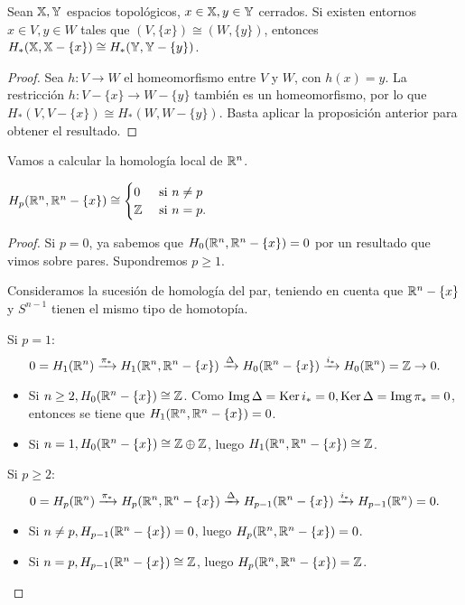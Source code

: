 \begin{proposition}
  Sean ${\mathbb X}, {\mathbb Y}$ espacios topológicos, $x \in {\mathbb X}, y \in {\mathbb Y}$ cerrados. Si existen entornos $x \in V, y \in W$ tales que $(V, \{x\}) \cong (W, \{y\})$,
  entonces $H_*({\mathbb X}, {\mathbb X} - \{x\}) \cong H_*({\mathbb Y}, {\mathbb Y} - \{y\})$.
\end{proposition}

\begin{proof}
  Sea $h \colon V \to W$ el homeomorfismo entre $V$ y $W$, con $h(x) = y$. La restricción $h \colon V - \{x\} \to W - \{y\}$ también es un homeomorfismo,
  por lo que $H_*(V, V - \{x\}) \cong H_*(W, W - \{y\})$. Basta aplicar la proposición anterior para obtener el resultado.
\end{proof}

Vamos a calcular la homología local de $\mathbb{R}^n$.

\begin{proposition}
  $H_p(\mathbb{R}^n, \mathbb{R}^n - \{x\}) \cong \begin{cases} 0 &\text{ si } n \neq p \\ \mathbb{Z} &\text{ si } n = p. \end{cases}$
\end{proposition}

\begin{proof}
  Si $p = 0$, ya sabemos que $H_0(\mathbb{R}^n, \mathbb{R}^n - \{x\}) = 0$ por un resultado que vimos sobre pares. Supondremos $p \geq 1$.

  Consideramos la sucesión de homología del par, teniendo en cuenta que $\mathbb{R}^n - \{x\}$ y $S^{n-1}$ tienen el mismo tipo de homotopía.

  Si $p = 1$:
  \[ 0 = H_1(\mathbb{R}^n) \xrightarrow{\pi_*} H_1(\mathbb{R}^n, \mathbb{R}^n - \{x\}) \xrightarrow{\Delta} H_0(\mathbb{R}^n - \{x\}) \xrightarrow{i_*} H_0(\mathbb{R}^n) = \mathbb{Z} \to 0. \]
  \begin{itemize}
    \item Si $n \geq 2, H_0(\mathbb{R}^n - \{x\}) \cong \mathbb{Z}$. Como $\operatorname{Img} \Delta = \operatorname{Ker} i_* = 0, \operatorname{Ker} \Delta = \operatorname{Img} \pi_* = 0$, entonces se tiene que
          $H_1(\mathbb{R}^n, \mathbb{R}^n - \{x\}) = 0$.
    \item Si $n = 1, H_0(\mathbb{R}^n - \{x\}) \cong \mathbb{Z} \oplus \mathbb{Z}$, luego $H_1(\mathbb{R}^n, \mathbb{R}^n - \{x\}) \cong \mathbb{Z}$.
  \end{itemize}

  Si $p \geq 2$:
  \[ 0 = H_p(\mathbb{R}^n) \xrightarrow{\pi_*} H_p(\mathbb{R}^n, \mathbb{R}^n - \{x\}) \xrightarrow{\Delta} H_{p-1}(\mathbb{R}^n - \{x\}) \xrightarrow{i_*} H_{p-1}(\mathbb{R}^n) = 0. \]
  \begin{itemize}
    \item Si $n \neq p, H_{p-1}(\mathbb{R}^n - \{x\}) = 0$, luego $H_p(\mathbb{R}^n, \mathbb{R}^n - \{x\}) = 0$.
    \item Si $n = p, H_{p-1}(\mathbb{R}^n - \{x\}) \cong \mathbb{Z}$, luego  $H_p(\mathbb{R}^n, \mathbb{R}^n - \{x\}) = \mathbb{Z}$.
  \end{itemize}
\end{proof}

